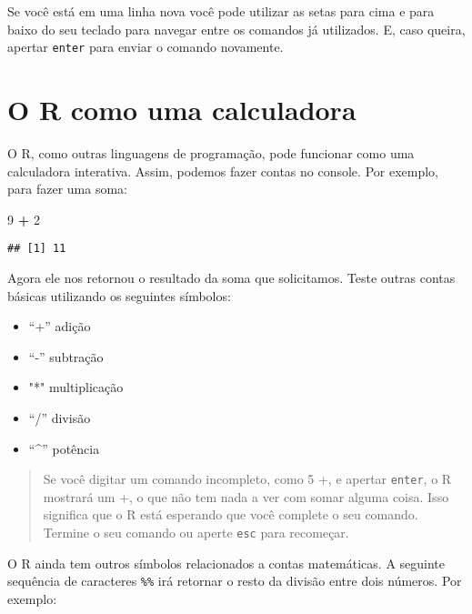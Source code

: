 \documentclass[]{book}
\newenvironment{Shaded}{\begin{snugshade}}{\end{snugshade}}
\newcommand{\DecValTok}[1]{\textcolor[rgb]{0.00,0.00,0.81}{#1}}
\newcommand{\OperatorTok}[1]{\textcolor[rgb]{0.81,0.36,0.00}{\textbf{#1}}}
\newcommand{\StringTok}[1]{\textcolor[rgb]{0.31,0.60,0.02}{#1}}
\providecommand{\tightlist}{%
  \setlength{\itemsep}{0pt}\setlength{\parskip}{0pt}}
\theoremstyle{definition}
\theoremstyle{definition}
\theoremstyle{definition}
\theoremstyle{remark}
\begin{document}
Se você está em uma linha nova você pode utilizar as setas para cima e para baixo do seu teclado para navegar entre os comandos já utilizados. E, caso queira, apertar \texttt{enter} para enviar o comando novamente.

\hypertarget{o-r-como-uma-calculadora}{%
\section{O R como uma calculadora}\label{o-r-como-uma-calculadora}}

O R, como outras linguagens de programação, pode funcionar como uma calculadora interativa. Assim, podemos fazer contas no console. Por exemplo, para fazer uma soma:

\begin{Shaded}
\begin{Highlighting}[]
\DecValTok{9} \OperatorTok{+}\StringTok{ }\DecValTok{2} 
\end{Highlighting}
\end{Shaded}

\begin{verbatim}
## [1] 11
\end{verbatim}

Agora ele nos retornou o resultado da soma que solicitamos. Teste outras contas básicas utilizando os seguintes símbolos:

\begin{itemize}
\tightlist
\item
  ``+'' adição
\item
  ``-'' subtração
\item
  "*" multiplicação
\item
  ``/'' divisão
\item
  ``\^{}'' potência
\end{itemize}

\begin{quote}
Se você digitar um comando incompleto, como 5 +, e apertar \texttt{enter}, o R mostrará um +, o que não tem nada a ver com somar alguma coisa. Isso significa que o R está esperando que você complete o seu comando. Termine o seu comando ou aperte \texttt{esc} para recomeçar.
\end{quote}

O R ainda tem outros símbolos relacionados a contas matemáticas. A seguinte sequência de caracteres \texttt{\%\%} irá retornar o resto da divisão entre dois números. Por exemplo:

\begin{Shaded}
\end{Shaded}
\end{document}
